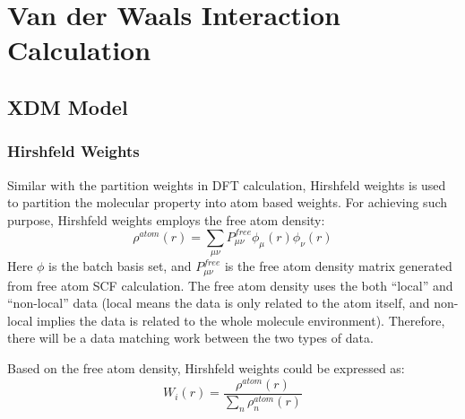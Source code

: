 
%
%
\chapter{Van der Waals Interaction Calculation}


\section{XDM Model}
%
%


\subsection{Hirshfeld Weights}
%
%
%
Similar with the partition weights in DFT calculation, Hirshfeld weights 
is used to partition the molecular property into atom based weights. 
For achieving such purpose, Hirshfeld weights employs the free atom
density:
\begin{equation}
\rho^{atom}(r) = \sum_{\mu\nu} P_{\mu\nu}^{free} \phi_{\mu}(r)\phi_{\nu}(r)
\end{equation} 
Here $\phi$ is the batch basis set, and $P_{\mu\nu}^{free}$ is the free
atom density matrix generated from free atom SCF calculation. 
The free atom density uses the both ``local'' and ``non-local'' data
(local means the data is only related to the atom itself, and non-local
implies the data is related to the whole molecule environment). Therefore,
there will be a data matching work between the two types of data.

Based on the free atom density, Hirshfeld weights could be expressed as:
\begin{equation}
  W_{i}(r) = \frac{\rho^{atom}(r)}{\sum_{n}\rho^{atom}_{n}(r)} 
\end{equation} 



